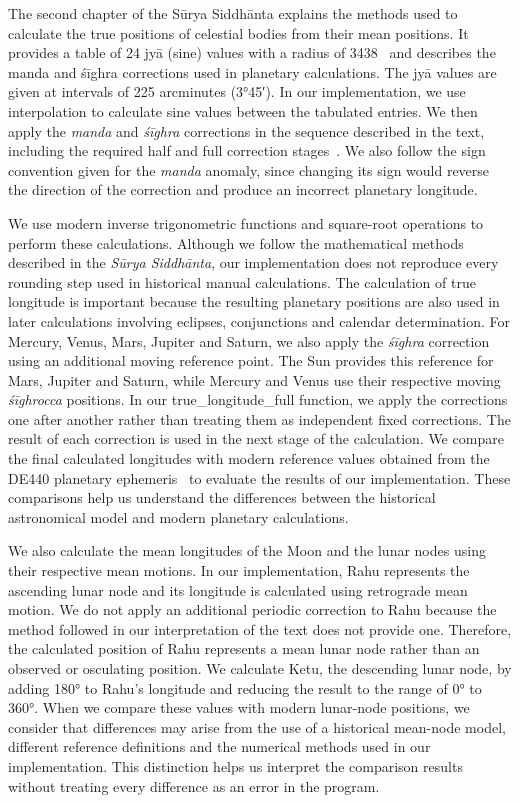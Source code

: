\documentclass[12pt,a4paper,oneside]{report}
\newcommand{\surya}{Sūrya Siddhānta\xspace}
\begin{document}
The second chapter of the \surya explains the methods used to calculate the true positions of celestial bodies from their mean positions. It provides a table of 24 jyā (sine) values with a radius of 3438~\cite{burgess1860,plofker2009} and describes the manda and śīghra corrections used in planetary calculations. The jyā values are given at intervals of 225 arcminutes (3°45′). In our implementation, we use interpolation to calculate sine values between the tabulated entries. We then apply the \emph{manda} and \emph{śīghra} corrections in the sequence described in the text, including the required half and full correction stages~\cite{burgess1860,duke2005}. We also follow the sign convention given for the \emph{manda} anomaly, since changing its sign would reverse the direction of the correction and produce an incorrect planetary longitude.

We use modern inverse trigonometric functions and square-root operations to perform these calculations. Although we follow the mathematical methods described in the \emph{\surya}, our implementation does not reproduce every rounding step used in historical manual calculations. The calculation of true longitude is important because the resulting planetary positions are also used in later calculations involving eclipses, conjunctions and calendar determination. For Mercury, Venus, Mars, Jupiter and Saturn, we also apply the \emph{śīghra} correction using an additional moving reference point. The Sun provides this reference for Mars, Jupiter and Saturn, while Mercury and Venus use their respective moving \emph{śīghrocca} positions. In our true\_longitude\_full function, we apply the corrections one after another rather than treating them as independent fixed corrections. The result of each correction is used in the next stage of the calculation. We compare the final calculated longitudes with modern reference values obtained from the DE440 planetary ephemeris~\cite{Park2021DE440} to evaluate the results of our implementation. These comparisons help us understand the differences between the historical astronomical model and modern planetary calculations.

We also calculate the mean longitudes of the Moon and the lunar nodes using their respective mean motions. In our implementation, Rahu represents the ascending lunar node and its longitude is calculated using retrograde mean motion. We do not apply an additional periodic correction to Rahu because the method followed in our interpretation of the text does not provide one. Therefore, the calculated position of Rahu represents a mean lunar node rather than an observed or osculating position. We calculate Ketu, the descending lunar node, by adding 180° to Rahu's longitude and reducing the result to the range of 0° to 360°. When we compare these values with modern lunar-node positions, we consider that differences may arise from the use of a historical mean-node model, different reference definitions and the numerical methods used in our implementation. This distinction helps us interpret the comparison results without treating every difference as an error in the program.
\end{document}

